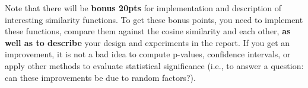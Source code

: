 \documentclass[oneside,11pt]{memoir}
\begin{document}
Note that there will be \textbf{bonus 20pts} for implementation and description
of interesting similarity functions. 
To get these bonus points, you need to 
implement these functions, compare them against the cosine similarity and each other,
\textbf{as well as to describe} your design and experiments in the report.
If you get an improvement, it is not a bad idea to compute p-values,
confidence intervals, or apply other methods to evaluate statistical significance (i.e.,
to answer a question: can these improvements be due to random factors?).




%
\end{document}
